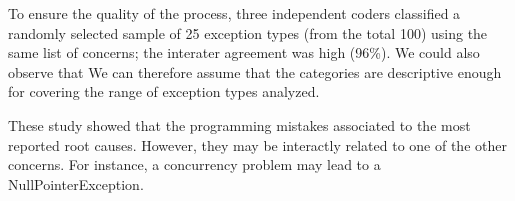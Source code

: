 \documentclass[conference]{IEEEtran}
\begin{document}
To ensure the quality of the process, three independent coders classified a randomly selected
sample of 25 exception types (from the total 100) using the same list of concerns;
the interater agreement was high (96\%). We could also observe that
We can therefore assume that the categories are descriptive 
enough for covering the range of exception types analyzed.

These study showed that the programming mistakes associated to the most reported root causes. 
However, they may be interactly related to one of the other concerns. For  instance, a concurrency problem may 
lead to a NullPointerException. 

\noindent {}





\end{document}
